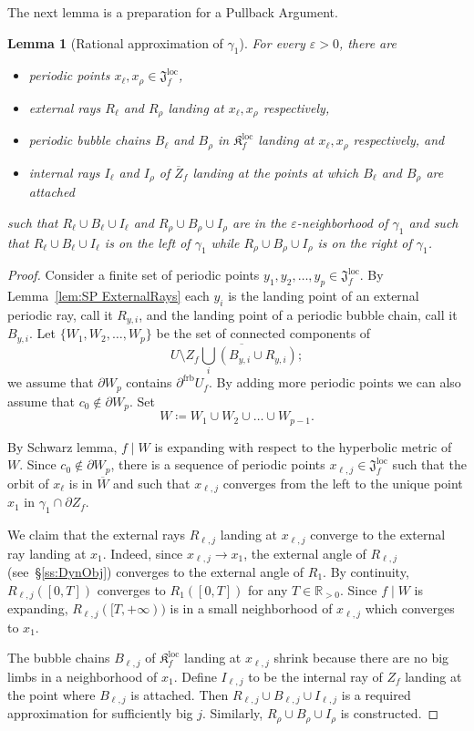 \documentclass[]{amsart}
\newcommand\Jul{{\mathfrak J}}
\newcommand\Kfilled{{\mathfrak K}}
\newcommand\frb{{\operatorname{frb}}}
\newcommand{\R}{\mathbb{R}}
\newtheorem{lem}[thm]{Lemma}
\theoremstyle{remark}
\numberwithin{equation}{section}
\theoremstyle{definition}
\def\loc{{\mathrm{loc}}}
\begin{document}
The next lemma is a preparation for a Pullback Argument.
\begin{lem}[Rational approximation of $\gamma_1$]
\label{lem:SP per pts and rays}
For every $\varepsilon>0$, there are 
\begin{itemize}
\item periodic points $x_\ell,x_\rho\in \Jul^\loc_f$,
\item external rays $R_\ell$ and $R_\rho$ landing at $x_\ell, x_\rho$ respectively,
\item periodic bubble chains $B_\ell$ and $B_\rho$ in $\Kfilled^\loc_f$ landing at $x_\ell, x_\rho$ respectively, and  
\item internal rays $I_\ell$ and $I_\rho$ of $\overline Z_f$ landing at the points at which $B_\ell$ and $B_\rho$ are attached  
\end{itemize}
such that $ R_\ell \cup B_\ell\cup I_\ell$ and $R_\rho \cup B_\rho\cup I_\rho$ are in the $\varepsilon$-neighborhood of $\gamma_1$ and such that $R_\ell\cup B_\ell\cup I_\ell$ is on the left of $\gamma_1$ while $R_\rho\cup B_\rho\cup I_\rho$ is on the right of $\gamma_1$.
\end{lem}
\begin{proof}
Consider a finite set of periodic points $y_1,y_2,\dots , y_p\in \Jul^\loc_f$. By Lemma~\ref{lem:SP ExternalRays} each $y_i$ is the landing point of an external periodic ray, call it $R_{y,i}$, and the landing point of a periodic bubble chain, call it $B_{y,i}$. Let $\{W_1,W_2,\dots, W_p\}$ be the set of connected components of 
\[U\setminus \overline {Z_f\bigcup_i (B_{y,i}\cup R_{y,i})};\]
we assume that $\partial W_p$ contains $\partial^\frb U_f$.
By adding more periodic points we can also assume that $c_0\not\in \partial W_p$. Set 
\[W\coloneqq W_1\cup W_2\cup \dots \cup W_{p-1}.\]

By Schwarz lemma, $f\mid W$ is expanding with respect to the hyperbolic metric of $W$. Since $c_0\not\in \partial W_p$, there is a sequence of periodic points $x_{\ell, j}\in \Jul^\loc_f$ such that the orbit of $x_\ell$ is in $\overline W$ and such that  $x_{\ell, j}$ converges from the left to the unique point $x_1$ in $\gamma_1\cap \partial Z_f$. 

We claim that the external rays  $R_{\ell,j}$ landing at $x_{\ell,j}$ converge to the external ray landing at $x_1$. Indeed, since $x_{\ell,j}\to x_1$, the external angle of $R_{\ell,j}$ (see~\S\ref{ss:DynObj}) converges to the external angle of $R_1$. By continuity, $R_{\ell,j}([0,T])$ converges to $R_{1}([0,T])$ for any $T\in  \R_{>0}$. Since $f\mid W$ is expanding, $R_{\ell,j}([T,+\infty))$ is in a small neighborhood of $x_{\ell,j}$ which converges to $x_1$.


The bubble chains $B_{\ell,j}$ of $\Kfilled^\loc_f$ landing at $x_{\ell,j}$ shrink because there are no big limbs in a neighborhood of $x_1$. Define $I_{\ell, j}$ to be the internal ray of $Z_f$ landing at the point where $B_{\ell,j}$  is attached. Then $R_{\ell,j}\cup B_{\ell,j}\cup I_{\ell,j}$ is a required approximation for sufficiently big $j$. Similarly, $R_{\rho}\cup B_{\rho}\cup I_{\rho}$ is constructed.
\end{proof}
\end{document}
